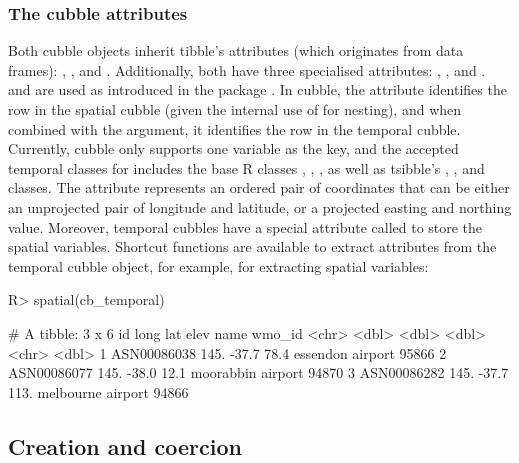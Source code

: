 \documentclass[
  shortnames]{jss}
\begin{document}
\hypertarget{the-cubble-attributes}{%
\subsubsection{The cubble attributes}\label{the-cubble-attributes}}

Both cubble objects inherit tibble's attributes (which originates from data frames): , , and . Additionally, both have three specialised attributes: , , and .  and  are used as introduced in the  package \citep{tsibble}. In cubble, the  attribute identifies the row in the spatial cubble (given the internal use of  for nesting), and when combined with the  argument, it identifies the row in the temporal cubble. Currently, cubble only supports one variable as the key, and the accepted temporal classes for  includes the base R classes , , , as well as tsibble's , , and  classes. The  attribute represents an ordered pair of coordinates that can be either an unprojected pair of longitude and latitude, or a projected easting and northing value. Moreover, temporal cubbles have a special attribute called  to store the spatial variables. Shortcut functions are available to extract attributes from the temporal cubble object, for example,  for extracting spatial variables:

\begin{CodeChunk}
\begin{CodeInput}
R> spatial(cb_temporal)
\end{CodeInput}
\begin{CodeOutput}
# A tibble: 3 x 6
  id           long   lat  elev name              wmo_id
  <chr>       <dbl> <dbl> <dbl> <chr>              <dbl>
1 ASN00086038  145. -37.7  78.4 essendon airport   95866
2 ASN00086077  145. -38.0  12.1 moorabbin airport  94870
3 ASN00086282  145. -37.7 113.  melbourne airport  94866
\end{CodeOutput}
\end{CodeChunk}

\hypertarget{create}{%
\subsection{Creation and coercion}\label{create}}
\end{document}
